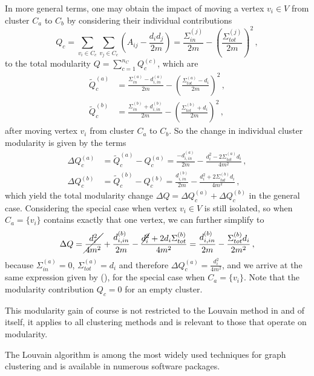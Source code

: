 \documentclass{prettytex/ox/mmsc-special-topic}
\begin{document}
  In more general terms, one may obtain the impact of moving a vertex $v_i \in V$ from cluster $C_a$ to $C_b$ by considering their individual contributions
  $$Q_c = \sum_{v_i \in C_c} \sum_{v_j \in C_c} \left(A_{ij} - \frac{d_i d_j}{2m}\right) = \frac{\Sigma_{in}^{(j)}}{2m} - \left(\frac{\Sigma_{tot}^{(j)}}{2m}\right)^2\,,$$
  to the total modularity $Q = \sum_{c=1}^{n_C} Q_c^{(c)}$, which are
  \begin{align*}
    \tilde{Q}_c^{(a)} & = \frac{\Sigma_{in}^{(a)} - d_{i, in}^{(a)}}{2m} - \left(\frac{\Sigma_{tot}^{(a)} - d_i}{2m}\right)^2\,, \\
    \tilde{Q}_c^{(b)} & = \frac{\Sigma_{in}^{(b)} + d_{i, in}^{(b)}}{2m} - \left(\frac{\Sigma_{tot}^{(b)} + d_i}{2m}\right)^2\,,
  \end{align*}
  after moving vertex $v_i$ from cluster $C_a$ to $C_b$.
  So the change in individual cluster modularity is given by the terms
  \begin{align*}
    \Delta Q_c^{(a)} & = \tilde{Q}_c^{(a)} - Q_c^{(a)} = \frac{-d_{i, in}^{(a)}}{2m} - \frac{d_i^2 - 2 \Sigma_{tot}^{(a)} d_i}{4m^2}\,, \\
    \Delta Q_c^{(b)} & = \tilde{Q}_c^{(b)} - Q_c^{(b)} = \frac{d_{i, in}^{(b)}}{2m} - \frac{d_i^2 + 2 \Sigma_{tot}^{(b)} d_i}{4m^2}\,,
  \end{align*}
  which yield the total modularity change $\Delta Q = \Delta Q_c^{(a)} + \Delta Q_c^{(b)}$ in the general case.
  Considering the special case when vertex $v_i \in V$ is still isolated, so when $C_a = \{v_i\}$ contains exactly that one vertex, we can further simplify to
  $$\Delta Q = \cancel{\frac{d_i^2}{4m^2}} + \frac{d_{i,in}^{(b)}}{2m} - \frac{\cancel{d_i^2} + 2 d_i \Sigma_{tot}^{(b)}}{4m^2} = \frac{d_{i,in}^{(b)}}{2m} - \frac{\Sigma_{tot}^{(b)} d_i}{2m^2} \,,$$
  because $\Sigma_{in}^{(a)} = 0$, $\Sigma_{tot}^{(a)} = d_i$ and therefore $\Delta Q_c^{(a)} = \frac{d_i^2}{4m^2}$, and we arrive at the same expression given by \cite{lambiotte-louvain-clustering} (), for the special case when $C_a = \{v_i\}$.
  Note that the modularity contribution $Q_c = 0$ for an empty cluster.

  This modularity gain of course is not restricted to the Louvain method in and of itself, it applies to all clustering methods and is relevant to those that operate on modularity.

  The Louvain algorithm is among the most widely used techniques for graph clustering and is available in numerous software packages.
\end{document}
